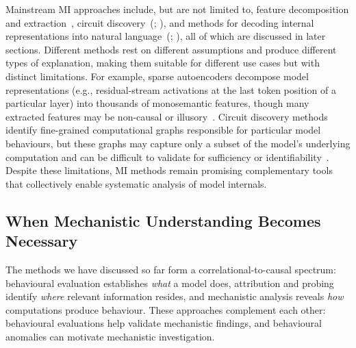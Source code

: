 Mainstream MI approaches include, but are not limited to, feature decomposition and extraction~, circuit discovery~(; ), and methods for decoding internal representations into natural language~(; ), all of which are discussed in later sections. Different methods rest on different assumptions and produce different types of explanation, making them suitable for different use cases but with distinct limitations. For example, sparse autoencoders decompose model representations (e.g., residual-stream activations at the last token position of a particular layer) into thousands of monosemantic features, though many extracted features may be non-causal or illusory~. Circuit discovery methods identify fine-grained computational graphs responsible for particular model behaviours, but these graphs may capture only a subset of the model's underlying computation and can be difficult to validate for sufficiency or identifiability~. Despite these limitations, MI methods remain promising complementary tools that collectively enable systematic analysis of model internals.

\subsection{When Mechanistic Understanding Becomes Necessary}
\label{subsec: mech interp necessary}
The methods we have discussed so far form a correlational-to-causal spectrum: behavioural evaluation establishes \textit{what} a model does, attribution and probing identify \textit{where} relevant information resides, and mechanistic analysis reveals \textit{how} computations produce behaviour. These approaches complement each other: behavioural evaluations help validate mechanistic findings, and behavioural anomalies can motivate mechanistic investigation.

